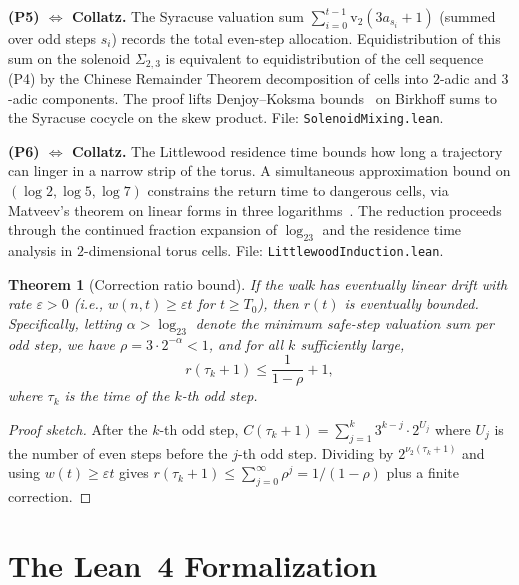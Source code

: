 \documentclass{CUP-JNL-FMP}%
\newtheorem{theorem}{Theorem}[section]
\theoremstyle{definition}
\numberwithin{equation}{section}
\newcommand{\val}{\mathrm{v}_2}
\newcommand{\logb}{\log_2}
\begin{document}
\medskip\noindent\textbf{(P5) $\Leftrightarrow$ Collatz.}
The Syracuse valuation sum $\sum_{i=0}^{t-1} \val(3a_{s_i}+1)$ (summed over
odd steps $s_i$) records the total even-step allocation.
Equidistribution of this sum on the solenoid $\Sigma_{2,3}$ is equivalent to
equidistribution of the cell sequence (P4) by the Chinese Remainder Theorem
decomposition of cells into $2$-adic and $3$-adic components.
The proof lifts Denjoy--Koksma bounds~\cite{Herman1979} on Birkhoff sums
to the Syracuse cocycle on the skew product.
File: \texttt{SolenoidMixing.lean}.

\medskip\noindent\textbf{(P6) $\Leftrightarrow$ Collatz.}
The Littlewood residence time bounds how long a trajectory can linger in a
narrow strip of the torus.  A simultaneous approximation bound on
$(\log 2, \log 5, \log 7)$ constrains the return time to dangerous cells,
via Matveev's theorem on linear forms in three logarithms~\cite{Matveev2000}.
The reduction proceeds through the continued fraction expansion of $\logb 3$
and the residence time analysis in $2$-dimensional torus cells.
File: \texttt{LittlewoodInduction.lean}.

\begin{theorem}[Correction ratio bound]\label{thm:r-bound}
  If the walk has eventually linear drift with rate $\varepsilon > 0$
  (i.e., $w(n,t) \geq \varepsilon t$ for $t \geq T_0$), then $r(t)$ is
  eventually bounded.  Specifically, letting $\alpha > \logb 3$ denote the
  minimum safe-step valuation sum per odd step, we have $\rho = 3 \cdot 2^{-\alpha} < 1$,
  and for all $k$ sufficiently large,
  \begin{equation}\label{eq:r-bound}
    r(\tau_k + 1) \leq \frac{1}{1-\rho} + 1,
  \end{equation}
  where $\tau_k$ is the time of the $k$-th odd step.
\end{theorem}

\begin{proof}[Proof sketch]
  After the $k$-th odd step, $C(\tau_k+1) = \sum_{j=1}^{k} 3^{k-j} \cdot 2^{U_j}$
  where $U_j$ is the number of even steps before the $j$-th odd step.
  Dividing by $2^{\nu_2(\tau_k+1)}$ and using $w(t) \geq \varepsilon t$
  gives $r(\tau_k+1) \leq \sum_{j=0}^{\infty} \rho^j = 1/(1-\rho)$ plus a
  finite correction.
\end{proof}


\section{The Lean~4 Formalization}\label{sec:lean}
\end{document}
